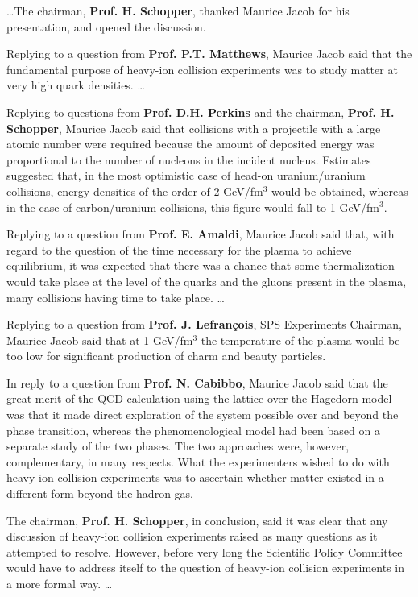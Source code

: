 \begin{mdframed}[linecolor=gray,roundcorner=12pt,backgroundcolor=GreenYellow!15,linewidth=1pt,leftmargin=0cm,rightmargin=0cm,topline=true,bottomline=true,skipabove=12pt]
\ldots The chairman, {\bf Prof. H. Schopper}, thanked Maurice Jacob for his presentation, and opened the discussion. 

Replying to a question from {\bf Prof. P.T. Matthews}, Maurice Jacob said that the fundamental purpose of heavy-ion collision experiments was to study matter at very high quark densities. \ldots

Replying to questions from {\bf Prof. D.H. Perkins} and the chairman, {\bf Prof. H. Schopper}, Maurice Jacob said that collisions with a projectile with a large atomic number were required because the amount of deposited energy was proportional to the number of nucleons in the incident nucleus. Estimates suggested that, in the most optimistic case of head-on uranium/uranium collisions, energy densities of the order of 2 GeV/fm$^3$ would be obtained, whereas in the case of carbon/uranium collisions, this figure would fall to 1 GeV/fm$^3$. 

Replying to a question from {\bf Prof. E. Amaldi}, Maurice Jacob said that, with regard to the question of the time necessary for the plasma to achieve equilibrium, it was expected that there was a chance that some thermalization would take place at the level of the quarks and the gluons present in the plasma, many collisions having time to take place. \ldots

Replying to a question from {\bf Prof. J. Lefran\c{c}ois}, SPS Experiments Chairman, Maurice Jacob said that at 1 GeV/fm$^3$ the temperature of the plasma would be too low for significant production of charm and beauty particles. 

In reply to a question from {\bf Prof. N. Cabibbo}, Maurice Jacob said that the great merit of the QCD calculation using the lattice over the Hagedorn model was that it made direct exploration of the system possible over and beyond the phase transition, whereas the phenomenological model had been based on a separate study of the two phases. The two approaches were, however, complementary, in many respects. What the experimenters wished to do with heavy-ion collision experiments was to ascertain whether matter existed in a different form beyond the hadron gas.

The chairman, {\bf Prof. H. Schopper}, in conclusion, said it was clear that any discussion of heavy-ion collision experiments raised as many questions as it attempted to resolve. However, before very long the Scientific Policy Committee would have to address itself to the question of heavy-ion collision experiments in a more formal way. \ldots\\



\end{mdframed}
